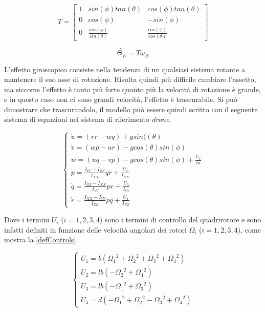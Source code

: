 \begin{equation}
T
=
\begin{bmatrix}
1 & sin(\phi)tan(\theta) & cos(\phi)tan(\theta)\\
0 & cos(\phi) & -sin(\phi)\\
0 & \frac{sin(\phi)}{sin(\theta)} & \frac{cos(\phi)}{cos(\theta)}
\end{bmatrix}
\label{matT}
\end{equation}

\begin{equation}
	\Dot{\Theta_E} = T\omega_B
	\label{eqSist2}
\end{equation}

L’effetto giroscopico consiste nella tendenza di un qualsiasi sistema rotante a mantenere il suo asse di rotazione. Risulta quindi più difficile cambiare l’assetto, ma siccome l’effetto è tanto più forte quanto più la velocità di rotazione è grande, e in questo caso non ci sono grandi velocità, l’effetto è trascurabile. Si può dimostrare che trascurandolo, il modello può essere quindi scritto con il seguente sistema di equazioni nel sistema di riferimento \emph{drone}.

\begin{equation}
	\begin{cases}
	\Dot{u} = (vr - wq) + gsin((\theta) \\
	\Dot{v} = (wp - ur) - gcos(\theta)sin(\phi) \\
	\Dot{w} = (uq - vp) - gcos(\theta)sin(\phi) + \frac{U_1}{m} \\
	\Dot{p} = \frac{I_{YY} - I_{ZZ}}{I_{XX}}qr + \frac{U_2}{I_{XX}} \\
	\Dot{q} = \frac{I_{ZZ} - I_{XX}}{I_{YY}}pr + \frac{U_3}{I_{YY}} \\
	\Dot{r} = \frac{I_{XX} - I_{YY}}{I_{ZZ}}pq + \frac{U_4}{I_{ZZ}}
	\end{cases}
	\label{modelloQuadrirotoreDrone}
\end{equation}

Dove i termini $U_i$ ($i = 1,2,3,4$) sono i termini di controllo del quadrirotore e sono infatti definiti in funzione delle velocità angolari dei rotori $\Omega_i$ ($i = 1,2,3,4$), come mostra la \ref{defControls}.

\begin{equation}
	\begin{cases}
	U_1 = b({\Omega_1}^2 + {\Omega_2}^2 + {\Omega_3}^2 + {\Omega_4}^2) \\
	U_2 = lb(- {\Omega_2}^2 + {\Omega_4}^2) \\
	U_3 = lb(- {\Omega_1}^2 + {\Omega_3}^2) \\
	U_4 = d(- {\Omega_1}^2 + {\Omega_2}^2 - {\Omega_3}^2 + {\Omega_4}^2)
	\end{cases}
	\label{defControls}
\end{equation}

